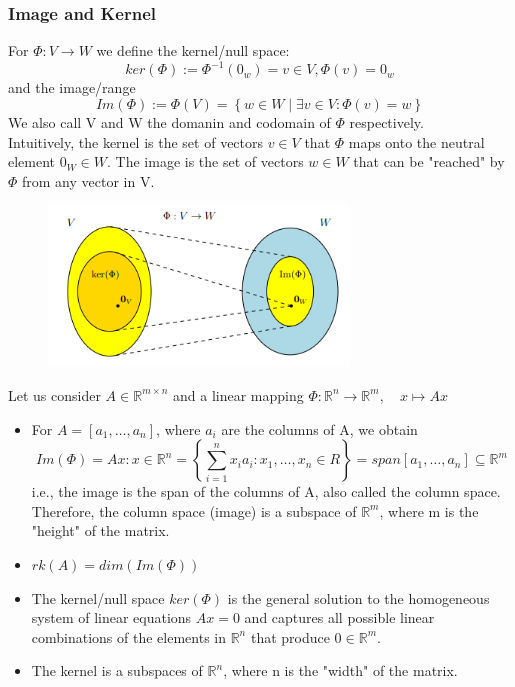 \subsubsection*{Image and Kernel}
\begin{definition}
    For $\Phi : V \rightarrow W$ we define the kernel/null space:
    \[ 
        ker(\Phi) := \Phi^{-1}(0_w) = {v \in V, \Phi(v) = 0_w} 
    \]and the image/range
    \[ 
         Im(\Phi) := \Phi(V) = \left\{ w \in W \mid \exists v \in V : \Phi(v) = w \right\}
    \]
    We also call V and W the domanin and codomain of $\Phi$ respectively.\\
    Intuitively, the kernel is the set of vectors $v\in V$ that $\Phi$ maps onto the neutral element $0_W \in W$. The image is the set of vectors $w \in W$ that can be "reached" by $\Phi$ from any vector in V.
    \begin{figure}[htbp]
        \centering
        \includegraphics[width=8cm]{Mathematical Background/image-kernel.png}
    \end{figure}
\end{definition}
\begin{remark}
    Let us consider $A \in \mathbb{R}^{m\times n}$ and a linear mapping $\Phi: \mathbb{R}^n \longrightarrow \mathbb{R}^m, \quad x \mapsto Ax$
    \begin{itemize}
        \item For $A=[a_{1}, \ldots,a_{n}]$, where $a_i$ are the columns of A, we obtain
        \[ 
            Im(\Phi) = {Ax: x \in \mathbb{R}^n} = \left\{ \sum_{i=1}^{n}{x_ia_i}:x_{1}, \ldots,x_{n}\in R \right\} = span[a_{1}, \ldots,a_{n}]\subseteq \mathbb{R}^m
        \]i.e., the image is the span of the columns of A, also called the column space. Therefore, the column space (image) is a subspace of $\mathbb{R}^m$, where m is the "height" of the matrix.
        \item $rk(A)=dim(Im(\Phi))$
        \item The kernel/null space $ker(\Phi)$ is the general solution to the homogeneous system of linear equations $Ax = 0$ and captures all possible linear combinations of the elements in $\mathbb{R}^n$ that produce $0 \in \mathbb{R}^m$.
        \item The kernel is a subspaces of $\mathbb{R}^n$, where n is the "width" of the matrix. 
    \end{itemize}
\end{remark}

